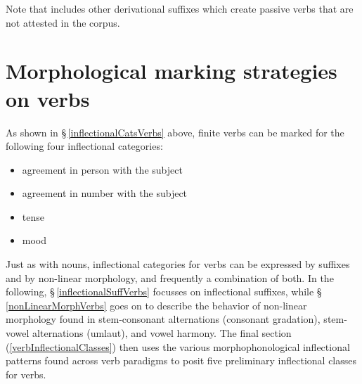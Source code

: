 Note that \citet{Ruong1945} includes other derivational suffixes which create passive verbs that are not attested in the corpus. 


\section{Morphological marking strategies on verbs}\label{markingVerbs}
As shown in §\,\ref{inflectionalCatsVerbs} above, finite verbs can be marked for the following four inflectional categories: 
\begin{itemize}
\item{agreement in person with the subject}
\item{agreement in number with the subject}
\item{tense}
\item{mood}
\end{itemize}
Just as with nouns, inflectional categories for verbs can be expressed by suffixes and by non-linear morphology, and frequently a combination of both. In the following, §\,\ref{inflectionalSuffVerbs} focusses on inflectional suffixes, while §\,\ref{nonLinearMorphVerbs} goes on to describe the behavior of non-linear morphology found in stem-consonant alternations (consonant gradation), stem-vowel alternations (umlaut), %
and vowel harmony. The final section (\ref{verbInflectionalClasses}) then uses the various morphophonological inflectional patterns found across verb paradigms to posit five preliminary inflectional classes for verbs.

\newcommand{\Xp}[1]{\MC{1}{x{80pt}}{#1}}%

